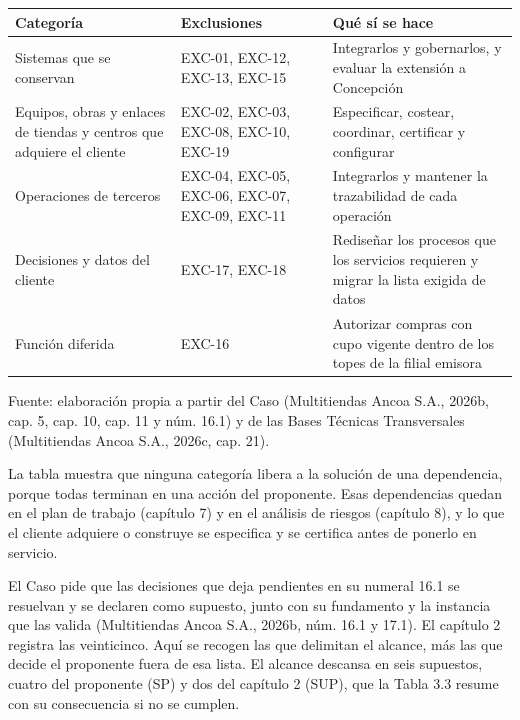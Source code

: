 \documentclass[11pt]{article}
\begin{document}
\begin{longtable}[]{@{}
  >{\raggedright\arraybackslash}p{}
  >{\raggedright\arraybackslash}p{}
  >{\raggedright\arraybackslash}p{}@{}}
\toprule\noalign{}
Categoría & Exclusiones & Qué sí se hace \\
\midrule\noalign{}
\endhead
\bottomrule\noalign{}
\endlastfoot
Sistemas que se conservan & EXC-01, EXC-12, EXC-13, EXC-15 & Integrarlos y gobernarlos, y evaluar la extensión a Concepción \\
Equipos, obras y enlaces de tiendas y centros que adquiere el cliente & EXC-02, EXC-03, EXC-08, EXC-10, EXC-19 & Especificar, costear, coordinar, certificar y configurar \\
Operaciones de terceros & EXC-04, EXC-05, EXC-06, EXC-07, EXC-09, EXC-11 & Integrarlos y mantener la trazabilidad de cada operación \\
Decisiones y datos del cliente & EXC-17, EXC-18 & Rediseñar los procesos que los servicios requieren y migrar la lista exigida de datos \\
Función diferida & EXC-16 & Autorizar compras con cupo vigente dentro de los topes de la filial emisora \\
\end{longtable}

Fuente: elaboración propia a partir del Caso (Multitiendas Ancoa S.A., 2026b, cap. 5, cap. 10, cap. 11 y núm. 16.1) y de las Bases Técnicas Transversales (Multitiendas Ancoa S.A., 2026c, cap. 21).

La tabla muestra que ninguna categoría libera a la solución de una dependencia, porque todas terminan en una acción del proponente. Esas dependencias quedan en el plan de trabajo (capítulo 7) y en el análisis de riesgos (capítulo 8), y lo que el cliente adquiere o construye se especifica y se certifica antes de ponerlo en servicio.

El Caso pide que las decisiones que deja pendientes en su numeral 16.1 se resuelvan y se declaren como supuesto, junto con su fundamento y la instancia que las valida (Multitiendas Ancoa S.A., 2026b, núm. 16.1 y 17.1). El capítulo 2 registra las veinticinco. Aquí se recogen las que delimitan el alcance, más las que decide el proponente fuera de esa lista. El alcance descansa en seis supuestos, cuatro del proponente (SP) y dos del capítulo 2 (SUP), que la Tabla 3.3 resume con su consecuencia si no se cumplen.
\end{document}
